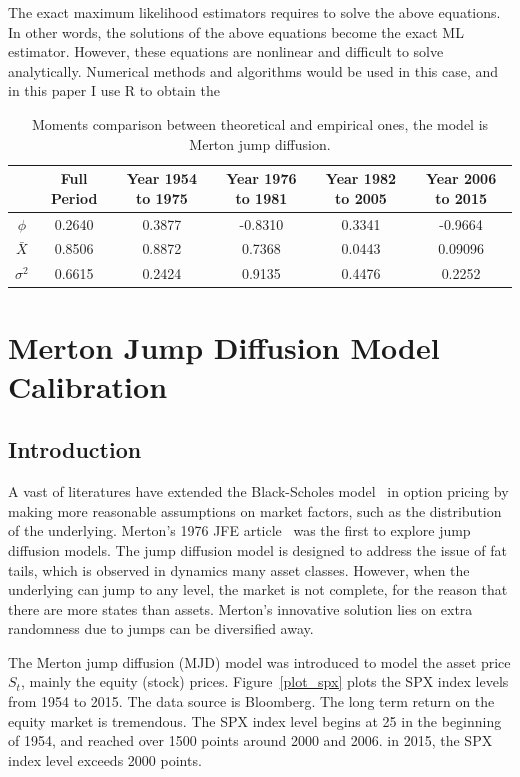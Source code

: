 \documentclass[11pt,reqno,final]{amsart}
\begin{document}
The exact maximum likelihood estimators requires to solve the above equations. In other words, the solutions of the above equations become the exact ML estimator. However, these equations are nonlinear and difficult to solve analytically. Numerical methods and algorithms would be used in this case, and in this paper I use $\mathrm{R}$ to obtain the

\begin{table}[H]
\begin{center}
\caption{Moments comparison between theoretical and empirical ones, the model is Merton jump diffusion.}
\begin{tabular}{c|c|c|c|c|c}
  \hline \hline
	&	Full Period	&	Year 1954 to 1975	&	Year 1976 to 1981	&	Year 1982 to 2005	&	Year 2006 to 2015	\\ \hline
$\phi$	&	0.2640	&	0.3877	&	-0.8310	&	0.3341	&	-0.9664	\\
$\bar{X}$	&	0.8506	&	0.8872	&	0.7368	&	0.0443	&	0.09096	\\
$\sigma^2$	&	0.6615	&	0.2424	&	0.9135	&	0.4476	&	0.2252	\\
  \hline\hline
\end{tabular}\label{tbl::mom_comp}
\end{center}
\end{table}


\section{Merton Jump Diffusion Model Calibration}
\subsection{Introduction}
A vast of literatures have extended the Black-Scholes model~\cite{BS73} in option pricing by making more reasonable assumptions on market factors, such as the distribution of the underlying. Merton's 1976 JFE article~\cite{M76} was the first to explore jump diffusion models. The jump diffusion model is designed to address the issue of fat tails, which is observed in dynamics many asset classes. However, when the underlying can jump to any level, the market is not complete, for the reason that there are more states than assets. Merton's innovative solution lies on extra randomness due to jumps can be diversified away.

The Merton jump diffusion (MJD) model was introduced to model the asset price $S_t$, mainly the equity (stock) prices. Figure~\ref{plot_spx} plots the SPX index levels from 1954 to 2015. The data source is Bloomberg. The long term return on the equity market is tremendous. The SPX index level begins at 25 in the beginning of 1954, and reached over 1500 points around 2000 and 2006. in 2015, the SPX index level exceeds 2000 points.
\end{document}
